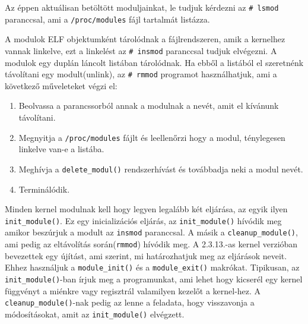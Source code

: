\noindent Az éppen aktuálisan betöltött moduljainkat, le tudjuk kérdezni az \texttt{\# lsmod} paranccsal, ami a \texttt{/proc/modules} fájl tartalmát listázza.

A modulok ELF objektumként tárolódnak a fájlrendszeren, amik a kernelhez vannak linkelve, ezt a linkelést az \texttt{\# insmod} paranccsal tudjuk elvégezni.
A modulok egy duplán láncolt listában tárolódnak.
Ha ebből a listából el szeretnénk távolítani egy modult(unlink), az \texttt{\# rmmod} programot használhatjuk, ami a következő műveleteket végzi el:
\begin{enumerate}
	\item Beolvassa a parancssorból annak a modulnak a nevét, amit el kívánunk távolítani.
	\item Megnyitja a \texttt{/proc/modules} fájlt és leellenőrzi hogy a modul, ténylegesen linkelve van-e a listába.
	\item Meghívja a \texttt{delete\_modul()} rendszerhívást és továbbadja neki a modul nevét.
	\item Terminálódik.
\end{enumerate} 

Minden kernel modulnak kell hogy legyen legalább két eljárása, az egyik ilyen \texttt{init\_module()}.
Ez egy inicializációs eljárás, az \texttt{init\_module()} hívódik meg amikor beszúrjuk a modult az \texttt{insmod} paranccsal.
A másik a \texttt{cleanup\_module()}, ami pedig az eltávolítás során(\texttt{rmmod}) hívódik meg.
A 2.3.13.-as kernel verzióban bevezettek egy újítást, ami szerint, mi határozhatjuk meg az eljárások neveit. Ehhez használjuk a \texttt{module\_init()} és a \texttt{module\_exit()} makrókat. Tipikusan, az \texttt{init\_module()}-ban írjuk meg a programunkat, ami lehet hogy kicserél egy kernel függvényt a miénkre vagy regisztrál valamilyen kezelőt a kernel-hez. A \texttt{cleanup\_module()}-nak pedig az lenne a feladata, hogy visszavonja a módosításokat, amit az \texttt{init\_module()} elvégzett.


